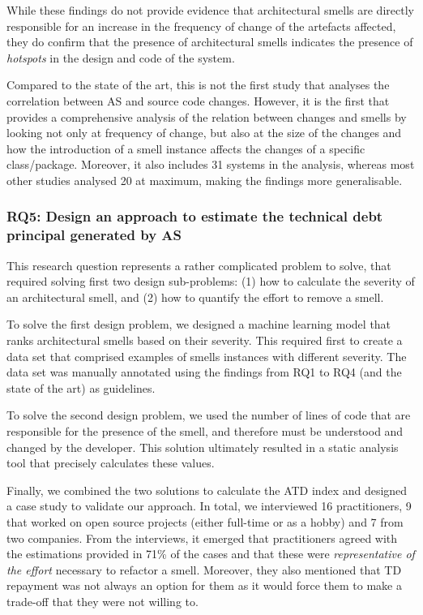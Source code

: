 While these findings do not provide evidence that architectural smells are directly responsible for an increase in the frequency of change of the artefacts affected, they do confirm that the presence of architectural smells indicates the presence of \emph{hotspots} in the design and code of the system.

Compared to the state of the art, this is not the first study that analyses the correlation between AS and source code changes. However, it is the first that provides a comprehensive analysis of the relation between changes and smells by looking not only at frequency of change, but also at the size of the changes and how the introduction of a smell instance affects the changes of a specific class/package.
Moreover, it also includes 31 systems in the analysis, whereas most other studies analysed 20 at maximum, making the findings more generalisable.

\subsubsection*{RQ5: Design an approach to estimate the technical debt principal generated by AS}
This research question represents a rather complicated problem to solve, that required solving first two design sub-problems: (1) how to calculate the severity of an architectural smell, and (2) how to quantify the effort to remove a smell.

To solve the first design problem, we designed a machine learning model that ranks architectural smells based on their severity. 
This required first to create a data set that comprised examples of smells instances with different severity. The data set was manually annotated using the findings from RQ1 to RQ4 (and the state of the art) as guidelines. 

To solve the second design problem, we used the number of lines of code that are responsible for the presence of the smell, and therefore must be understood and changed by the developer.
This solution ultimately resulted in a static analysis tool that precisely calculates these values.

Finally, we combined the two solutions to calculate the ATD index and designed a case study to validate our approach.
In total, we interviewed 16 practitioners, 9 that worked on open source projects (either full-time or as a hobby) and 7 from two companies.
From the interviews, it emerged that practitioners agreed with the estimations provided in 71\% of the cases and that these were \emph{representative of the effort} necessary to refactor a smell.
Moreover, they also mentioned that TD repayment was not always an option for them as it would force them to make a trade-off that they were not willing to.

